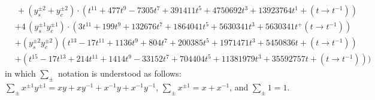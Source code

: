 \documentclass[letterpaper, 11pt]{article}
\newcommand{\nn}{\nonumber}
\begin{document}
{\begin{align}
  &\,+(y_s^{\pm2}+y_c^{\pm2}) \cdot (t^{11}+477t^{9}-7305t^7+391411t^5+4750692t^3+13923764t^{1}+ (t\rightarrow t^{-1}))\nn\\
  &+4\,(y_s^{\pm1}y_c^{\pm1})\cdot{(3t^{11}+199t^9+132676t^7+1864041t^5+5630341t^3+5630341t^+(t\rightarrow t^{-1}))}\nn\\
  &+(y_s^{\pm2}y_c^{\pm2})(t^{13}-17t^{11}+1136t^9+804t^7+200385t^5+1971471t^{3}+5450836t+(t\rightarrow t^{-1}))\nn\\
  &+(t^{15}-17t^{13}+214t^{11}+1414t^9-33152t^7+704404t^{5}+11381979t^{3}+35592757t+(t\rightarrow t^{-1}))\Big)\nn
\end{align}
in which $\sum_{\pm}$ notation is understood as follows: $\sum_{\pm}x^{\pm1}y^{\pm1} = xy+xy^{-1}+x^{-1}y+x^{-1}y^{-1}$, $\sum_{\pm}x^{\pm1} = x+x^{-1}$, and $\sum_{\pm} 1 = 1$.

}
\end{document}
